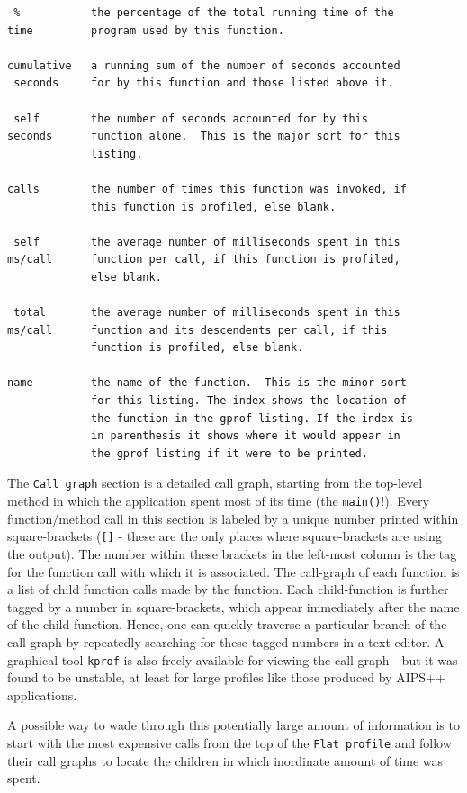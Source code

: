 \begin{verbatim}
 %           the percentage of the total running time of the
time         program used by this function.

cumulative   a running sum of the number of seconds accounted
 seconds     for by this function and those listed above it.

 self        the number of seconds accounted for by this
seconds      function alone.  This is the major sort for this
             listing.

calls        the number of times this function was invoked, if
             this function is profiled, else blank.
 
 self        the average number of milliseconds spent in this
ms/call      function per call, if this function is profiled,
             else blank.

 total       the average number of milliseconds spent in this
ms/call      function and its descendents per call, if this
             function is profiled, else blank.

name         the name of the function.  This is the minor sort
             for this listing. The index shows the location of
             the function in the gprof listing. If the index is
             in parenthesis it shows where it would appear in
             the gprof listing if it were to be printed.
\end{verbatim}

The {\tt Call graph} section is a detailed call graph, starting from
the top-level method in which the application spent most of its time
(the {\tt main()}!).  Every function/method call in this section is
labeled by a unique number printed within square-brackets ({\tt []} -
these are the only places where square-brackets are using the output).
The number within these brackets in the left-most column is the tag
for the function call with which it is associated.  The call-graph of
each function is a list of child function calls made by the function.
Each child-function is further tagged by a number in square-brackets,
which appear immediately after the name of the child-function.  Hence,
one can quickly traverse a particular branch of the call-graph by
repeatedly searching for these tagged numbers in a text editor.  A
graphical tool {\tt kprof} is also freely available for viewing the
call-graph - but it was found to be unstable, at least for large
profiles like those produced by AIPS++ applications.

A possible way to wade through this potentially large amount of
information is to start with the most expensive calls from the top of
the {\tt Flat profile} and follow their call graphs to locate the
children in which inordinate amount of time was spent.

